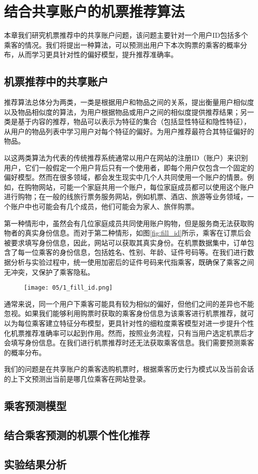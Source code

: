 
\chapter{结合共享账户的机票推荐算法}
\label{chap:share}

本章我们研究机票推荐中的共享账户问题，该问题主要针对一个用户ID包括多个乘客的情况。我们将提出一种算法，可以预测出用户下本次购票的乘客的概率分布，从而学习更具针对性的偏好模型，提升推荐准确率。

\section{机票推荐中的共享账户}

推荐算法总体分为两类，一类是根据用户和物品之间的关系，提出衡量用户相似度以及物品相似度的算法，为用户根据物品或用户之间的相似度提供推荐结果；另一类是基于内容的推荐，物品可以表示为特征的集合（包括显性特征和隐性特征），从用户的物品列表中学习用户对每个特征的偏好。为用户推荐最符合其特征偏好的物品。

以这两类算法为代表的传统推荐系统通常以用户在网站的注册ID（账户）来识别用户，它们一般假定一个用户背后只有一个使用者，即每个用户仅包含一个固定的偏好模型。然而在很多领域，都会发生现实中几个人共同使用一个账户的情景。例如，在购物网站，可能一个家庭共用一个账户，每位家庭成员都可以使用这个账户进行购物；在一般的线旅行票务服务网站，例如机票、酒店、旅游等业务领域，一个账户中也可能会有几个成员，他们可能会为家人、旅伴购票。


第一种情形中，虽然会有几位家庭成员共同使用账户购物，但是服务商无法获取购物者的真实身份信息。而对于第二种情形，如图\ref{fig:fill_id}所示，乘客在订票后会被要求填写身份信息，因此，网站可以获取其真实身份。在机票数据集中，订单包含了每一位乘客的身份信息，包括姓名、性别、年龄、证件号码等。在我们进行数据分析与实验过程中，统一使用加密后的证件号码来代指乘客，既确保了乘客之间无冲突，又保护了乘客隐私。

\begin{figure}
 \centering
 \texttt{[image: 05/1\_fill\_id.png]}
\end{figure}

通常来说，同一个用户下乘客可能具有较为相似的偏好，但他们之间的差异也不能忽视。如果我们能够利用购票时获取的乘客身份信息为该乘客进行机票推荐，就可以为每位乘客建立特征分布模型，更具针对性的细粒度乘客模型对进一步提升个性化机票推荐准确率可以起到作用。然而，按照业务流程，只有当用户选定机票后才会填写身份信息。在我们进行机票推荐时还无法获取乘客信息。我们需要预测乘客的概率分布。

我们的问题是在共享账户的乘客选购机票时，根据乘客历史行为模式以及当前会话的上下文预测出当前是哪几位乘客在网站登录。

\section{乘客预测模型}

\section{结合乘客预测的机票个性化推荐}

\section{实验结果分析}
